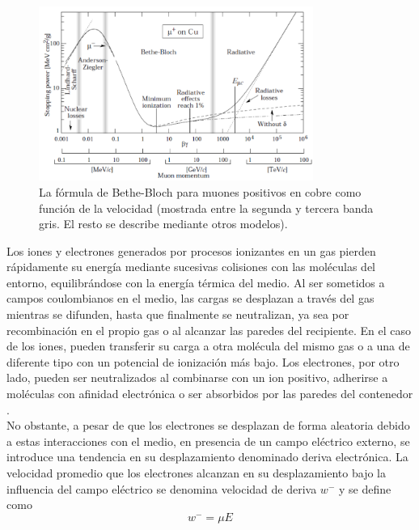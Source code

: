 \documentclass{article}
\begin{document}
\begin{figure}[H]
    \centering
    \includegraphics[width=0.8\textwidth]{bethe_bloch.PNG}
    \caption{La fórmula de Bethe-Bloch para muones positivos en cobre como función de la velocidad \cite{morisbak2010search} (mostrada entre la segunda y tercera banda gris. El resto se describe mediante otros modelos).}
    \label{fig:bethe_b}

\end{figure}

\noindent Los iones y electrones generados por procesos ionizantes en un gas pierden rápidamente su energía mediante sucesivas colisiones con las moléculas del entorno, equilibrándose con la energía térmica del medio. Al ser sometidos a campos coulombianos en el medio, las cargas se desplazan a través del gas mientras se difunden, hasta que finalmente se neutralizan, ya sea por recombinación en el propio gas o al alcanzar las paredes del recipiente. En el caso de los iones, pueden transferir su carga a otra molécula del mismo gas o a una de diferente tipo con un potencial de ionización más bajo. Los electrones, por otro lado, pueden ser neutralizados al combinarse con un ion positivo, adherirse a moléculas con afinidad electrónica o ser absorbidos por las paredes del contenedor \cite{loeb2023electrical}.\\

\noindent No obstante, a pesar de que los electrones se desplazan de forma aleatoria debido a estas interacciones con el medio, en presencia de un campo eléctrico externo, se introduce una tendencia en su desplazamiento denominado deriva electrónica. La velocidad promedio que los electrones alcanzan en su desplazamiento bajo la influencia del campo eléctrico se denomina velocidad de deriva $w^{-}$ y se define como 
\begin{equation}
    w^{-} = \mu E
\end{equation}
\end{document}
